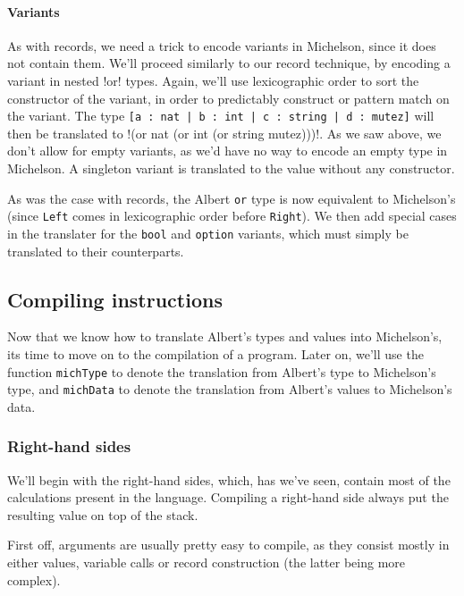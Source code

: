 \documentclass{report}
\begin{document}
\paragraph{Variants}

As with records, we need a trick to encode variants in Michelson, since it does not contain them. We'll proceed similarly to our record technique, by encoding a variant in nested !or! types. Again, we'll use lexicographic order to sort the constructor of the variant, in order to predictably construct or pattern match on the variant. The type \lstinline{[a : nat | b : int | c : string | d : mutez]} will then be translated to !(or nat (or int (or string mutez)))!. As we saw above, we don't allow for empty variants, as we'd have no way to encode an empty type in Michelson. A singleton variant is translated to the value without any constructor.

As was the case with records, the Albert \lstinline{or} type is now equivalent to Michelson's (since \lstinline{Left} comes in lexicographic order before \lstinline{Right}). We then add special cases in the translater for the \lstinline{bool} and \lstinline{option} variants, which must simply be translated to their counterparts.

\subsection{Compiling instructions}

Now that we know how to translate Albert's types and values into Michelson's, its time to move on to the compilation of a program. Later on, we'll use the function \texttt{michType} to denote the translation from Albert's type to Michelson's type, and \texttt{michData} to denote the translation from Albert's values to Michelson's data.

\subsubsection{Right-hand sides}

We'll begin with the right-hand sides, which, has we've seen, contain most of the calculations present in the language. Compiling a right-hand side always put the resulting value on top of the stack.

First off, arguments are usually pretty easy to compile, as they consist mostly in either values, variable calls or record construction (the latter being more complex).\\
\end{document}
